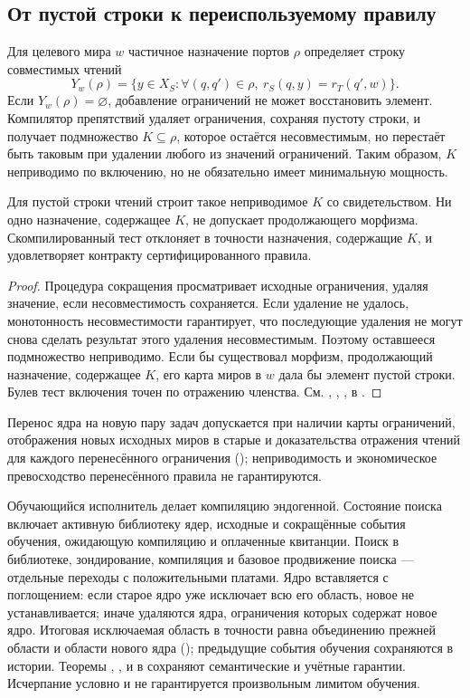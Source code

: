 \subsection{От пустой строки к переиспользуемому правилу}
Для целевого мира $w$ частичное назначение портов $\rho$ определяет строку совместимых чтений
\[
 Y_w(\rho)=\{y\in X_S: \forall(q,q')\in\rho,\ r_S(q,y)=r_T(q',w)\}.
\]
Если $Y_w(\rho)=\varnothing$, добавление ограничений не может восстановить элемент. Компилятор препятствий удаляет ограничения, сохраняя пустоту строки, и получает подмножество $K\subseteq\rho$, которое остаётся несовместимым, но перестаёт быть таковым при удалении любого из значений ограничений. Таким образом, $K$ неприводимо по включению, но не обязательно имеет минимальную мощность.
\begin{theorem}\label{thm:core}
Для пустой строки чтений  строит такое неприводимое $K$ со свидетельством. Ни одно назначение, содержащее $K$, не допускает продолжающего морфизма. Скомпилированный тест отклоняет в точности назначения, содержащие $K$, и удовлетворяет контракту сертифицированного правила.
\end{theorem}
\begin{proof}
Процедура сокращения просматривает исходные ограничения, удаляя значение, если несовместимость сохраняется. Если удаление не удалось, монотонность несовместимости гарантирует, что последующие удаления не могут снова сделать результат этого удаления несовместимым. Поэтому оставшееся подмножество неприводимо. Если бы существовал морфизм, продолжающий назначение, содержащее $K$, его карта миров в $w$ дала бы элемент пустой строки. Булев тест включения точен по отражению членства. См. , , ,  в .
\end{proof}
Перенос ядра на новую пару задач допускается при наличии карты ограничений, отображения новых исходных миров в старые и доказательства отражения чтений для каждого перенесённого ограничения (); неприводимость и экономическое превосходство перенесённого правила не гарантируются.

Обучающийся исполнитель делает компиляцию эндогенной. Состояние поиска включает активную библиотеку ядер, исходные и сокращённые события обучения, ожидающую компиляцию и оплаченные квитанции. Поиск в библиотеке, зондирование, компиляция и базовое продвижение поиска --- отдельные переходы с положительными платами. Ядро вставляется с поглощением: если старое ядро уже исключает всю его область, новое не устанавливается; иначе удаляются ядра, ограничения которых содержат новое ядро. Итоговая исключаемая область в точности равна объединению прежней области и области нового ядра (); предыдущие события обучения сохраняются в истории. Теоремы , ,  и  в  сохраняют семантические и учётные гарантии. Исчерпание условно и не гарантируется произвольным лимитом обучения.

